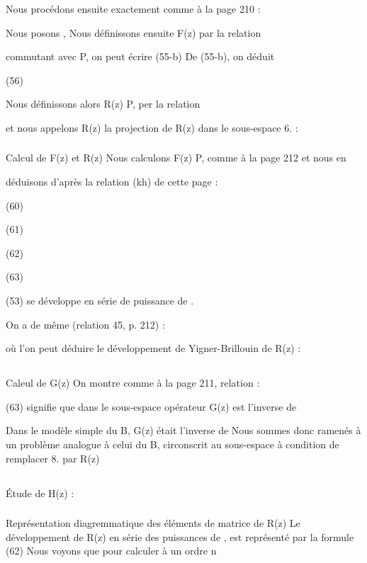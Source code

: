 Nous procédons ensuite exactement comme à la page 210 :

Nous posons
,
Nous définissons ensuite F(z) par la relation

commutant avec P, on peut écrire
(55-b)
De (55-b), on déduit

(56)

Nous définissons alors R(z) P, per la relation

et nous appelons R(z) la projection de R(z) dans le sous-espace 6. :

\subsubsection{} Calcul de F(z) et R(z)%
Nous calculons F(z) P, comme à la page 212 et nous en

déduisons d'après la relation (kh) de cette page :

(60)

(61)

(62)

(63)


(53) se développe en série de puissance de .

On a de même (relation 45, p. 212) :

où l'on peut déduire le développement de Yigner-Brillouin de R(z) :

\subsection{} Caleul de G(z)%
On montre comme à la page 211, relation :

(63) signifie que dans le sous-espace  opérateur G(z) est l'inverse de

Dans le modèle simple du  B, G(z) était l'inverse de
Nous sommes donc ramenés à un problème analogue à celui du  B, circonscrit
au sous-espace à condition de remplacer 8. par R(z)
\subsection{} Étude de H(z) :%
\subsubsection{} Représentation diagremmatique des éléments de matrice
de R(z)%
Le développement de R(z) en série des puissances de ,
est représenté par la formule (62) Nous voyons que pour calculer à un ordre n

